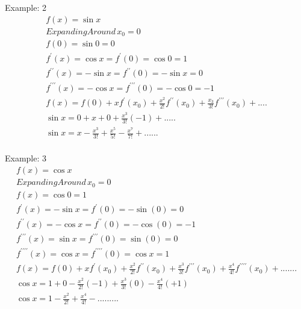 Example: 2
\begin{align}
	f(x) = \sin x \\
	Expanding Around \, x_0 = 0 \\
	f(0) = \sin 0 = 0 \\
	f^\prime(x)=\cos x =f^\prime(0)=\cos 0 = 1 \\
	f^{\prime\prime}(x)=-\sin x = f^{\prime\prime}(0)= -\sin x = 0 \\
	f^{\prime\prime\prime}(x)=-\cos x = f^{\prime\prime\prime}(0)=-\cos 0 = -1 \\
	f(x)=f(0)+xf^\prime(x_0)+\frac{x^2}{2!}f^{\prime\prime}(x_0)+\frac{x_3}{3!}f^{\prime\prime\prime}(x_0)+.... \\
	\sin x = 0+x+0+\frac{x^3}{3!}(-1)+..... \\
	\sin x = x-\frac{x^3}{3!}+\frac{x^5}{5!}-\frac{x^7}{7!}+...... \\
\end{align}


Example: 3
\begin{align}
	f(x)= \cos x \\
	Expanding Around \, x_0 = 0 \\
	f(x) = \cos 0 = 1 \\
	f^\prime(x) = -\sin x = f^\prime(0)=-\sin(0) = 0 \\
	f^{\prime\prime}(x) = - \cos x = f^{\prime\prime}(0)= -\cos(0) = -1 \\
	f^{\prime\prime\prime}(x)= \sin x = f^{\prime\prime\prime}(0)=\sin(0)= 0 \\
	f^{\prime\prime\prime\prime}(x)= \cos x = f^{\prime\prime\prime\prime}(0)=\cos x = 1 \\
	f(x) = f(0)+xf^\prime(x_0)+\frac{x^2}{2!}f^{\prime\prime}(x_0)+\frac{x^3}{3!}f^{\prime\prime\prime}(x_0)+\frac{x^4}{4!}
	f^{\prime\prime\prime\prime}(x_0)+....... \\
	\cos x = 1+0-\frac{x^2}{2!}(-1)+\frac{x^3}{3!}(0)-\frac{x^4}{4!}(+1)\\
	\cos x = 1-\frac{x^2}{2!}+\frac{x^4}{4!}-.........	
\end{align}


